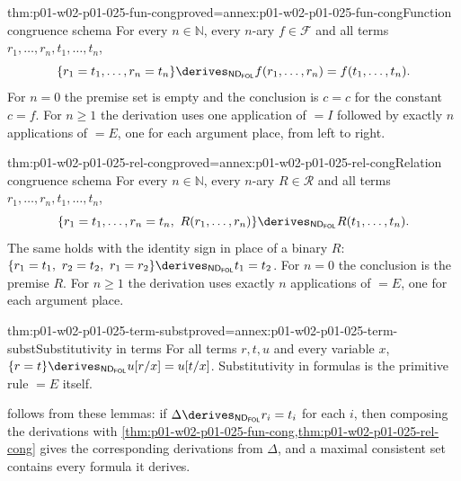 \begin{hblemma}{thm:p01-w02-p01-025-fun-cong}{proved=annex:p01-w02-p01-025-fun-cong}{Function congruence schema}
For every \(n\in\mathbb N\), every \(n\)-ary \(f\in\mathcal F\) and all terms
\(r_1,\ldots,r_n,t_1,\ldots,t_n\),
\[
 \{r_1=t_1,\ldots,r_n=t_n\}
 \derives_{\mathsf{ND}_{\mathsf{FOL}}}
 f(r_1,\ldots,r_n)=f(t_1,\ldots,t_n).
\]
For \(n=0\) the premise set is empty and the conclusion is \(c=c\) for the
constant \(c=f\).  For \(n\geq 1\) the derivation uses one application of
\(=I\) followed by exactly \(n\) applications of \(=E\), one for each
argument place, from left to right.
\end{hblemma}

\begin{hblemma}{thm:p01-w02-p01-025-rel-cong}{proved=annex:p01-w02-p01-025-rel-cong}{Relation congruence schema}
For every \(n\in\mathbb N\), every \(n\)-ary \(R\in\mathcal R\) and all terms
\(r_1,\ldots,r_n,t_1,\ldots,t_n\),
\[
 \{r_1=t_1,\ldots,r_n=t_n,\ R(r_1,\ldots,r_n)\}
 \derives_{\mathsf{ND}_{\mathsf{FOL}}}
 R(t_1,\ldots,t_n).
\]
The same holds with the identity sign in place of a binary \(R\):
\(\{r_1=t_1,\ r_2=t_2,\ r_1=r_2\}\derives_{\mathsf{ND}_{\mathsf{FOL}}}t_1=t_2\).
For \(n=0\) the conclusion is the premise \(R\).  For \(n\geq 1\) the
derivation uses exactly \(n\) applications of \(=E\), one for each argument
place.
\end{hblemma}

\begin{hblemma}{thm:p01-w02-p01-025-term-subst}{proved=annex:p01-w02-p01-025-term-subst}{Substitutivity in terms}
For all terms \(r,t,u\) and every variable \(x\),
\(\{r=t\}\derives_{\mathsf{ND}_{\mathsf{FOL}}}u[r/x]=u[t/x]\).
Substitutivity in formulas is the primitive rule \(=E\) itself.
\end{hblemma}

 follows from these lemmas: if
\(\Delta\derives_{\mathsf{ND}_{\mathsf{FOL}}}r_i=t_i\) for each \(i\), then
composing the derivations with
\cref{thm:p01-w02-p01-025-fun-cong,thm:p01-w02-p01-025-rel-cong} gives the
corresponding derivations from \(\Delta\), and a maximal consistent set
contains every formula it derives.

